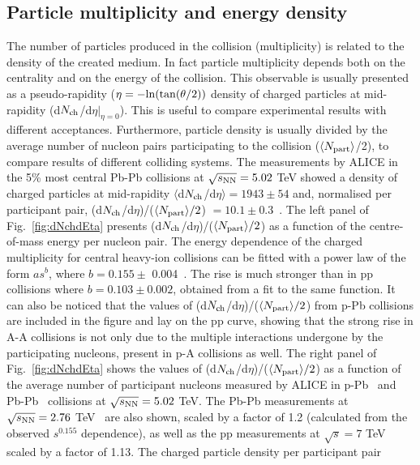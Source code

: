 \subsection{Particle multiplicity and energy density}
\label{sec:partMult}
The number of particles produced in the collision (multiplicity) is related to the 
density of the created medium. In fact particle multiplicity depends both on the 
centrality and on the energy of the collision. This observable is usually presented as 
a pseudo-rapidity ($\eta = - {\rm ln}(\tan(\theta/2))$ density of charged particles at 
mid-rapidity (d$N_{\rm ch}$/d$\eta |_{\eta=0}$). This is useful to compare experimental 
results with different acceptances. Furthermore, particle density is usually 
divided by the average number of nucleon pairs participating to the collision 
($\langle N_{\rm part}\rangle$/2), to compare results of different 
colliding systems. The measurements by ALICE in the 5\% 
most central Pb-Pb collisions at $\sqrt{s_{\rm NN}} = 5.02$ TeV showed a density of charged 
particles at mid-rapidity $\langle $d$N_{\rm ch}$/d$\eta \rangle = 1943 \pm 54$ 
and, normalised per participant pair, (d$N_{\rm ch}$/d$\eta$)/($\langle N_{\rm part} \rangle/2$) $ 
= 10.1 \pm 0.3$~\cite{Adam:2015ptt}.  
The left panel of Fig.~\ref{fig:dNchdEta} presents (d$N_{\rm ch}$/d$\eta$)/($\langle N_{\rm part} \rangle/2$) 
as a function of the centre-of-mass energy per nucleon pair. The energy dependence 
of the charged multiplicity for central heavy-ion collisions can be fitted with a power 
law of the form $as^b$, where $b = 0.155 \pm$ 0.004~\cite{Adam:2015ptt}. 
The rise is much stronger than in pp collisions where $b = 0.103 \pm 0.002$, 
obtained from a fit to the same function. It can also be noticed that the values 
of (d$N_{\rm ch}$/d$\eta$)/($\langle N_{\rm part} \rangle/2$) from p-Pb collisions are included in the figure 
and lay on the pp curve, showing that the strong rise in A-A collisions is not 
only due to the multiple interactions undergone by the participating nucleons, 
present in p-A collisions as well. The right panel of Fig.~\ref{fig:dNchdEta} 
shows the values of (d$N_{\rm ch}$/d$\eta$)/($\langle N_{\rm part} \rangle/2$) 
as a function of the average number of participant nucleons 
measured by ALICE in p-Pb~\cite{ALICE:2012xs} and Pb-Pb~\cite{Adam:2015ptt} 
collisions at $\sqrt{s_{\rm NN}} = 5.02$ TeV. The Pb-Pb measurements at 
$\sqrt{s_{\rm NN}} = 2.76 $ TeV~\cite{Aamodt:2010cz} are also shown, scaled by a 
factor of 1.2 (calculated from the observed $s^{0.155}$ dependence), as 
well as the pp measurements at $\sqrt{s}= 7$ TeV~\cite{Adam:2015gka} 
scaled by a factor of 1.13. The charged particle density per participant pair 
